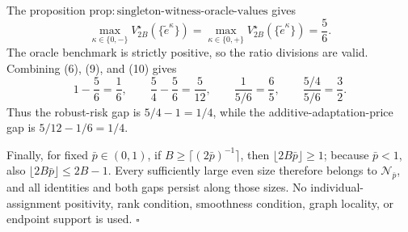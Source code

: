 The proposition \(\mathrm{prop{:}singleton\text{-}witness\text{-}oracle\text{-}values}\) gives
\[
 \max_{\kappa\in\{0,-\}}V_{2B}^\star(\{\widetilde e^\kappa\})
 =\max_{\kappa\in\{0,+\}}V_{2B}^\star(\{\widetilde e^\kappa\})
 =\frac56. \tag{10}
\]
The oracle benchmark is strictly positive, so the ratio divisions are valid.  Combining (6), (9), and (10) gives
\[
 1-\frac56=\frac16,
 \qquad
 \frac54-\frac56=\frac5{12},
 \qquad
 \frac{1}{5/6}=\frac65,
 \qquad
 \frac{5/4}{5/6}=\frac32. \tag{11}
\]
Thus the robust-risk gap is \(5/4-1=1/4\), while the additive-adaptation-price gap is \(5/12-1/6=1/4\).

Finally, for fixed \(\bar p\in(0,1)\), if \(B\ge\lceil(2\bar p)^{-1}\rceil\), then \(\lfloor2B\bar p\rfloor\ge1\); because \(\bar p<1\), also \(\lfloor2B\bar p\rfloor\le2B-1\).  Every sufficiently large even size therefore belongs to \(\mathcal N_{\bar p}\), and all identities and both gaps persist along those sizes.  No individual-assignment positivity, rank condition, smoothness condition, graph locality, or endpoint support is used. \(\square\)